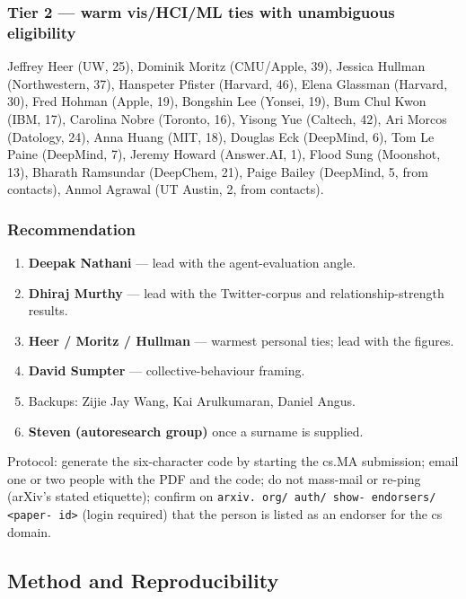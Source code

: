 \documentclass[twocolumn,10pt,letterpaper]{article}
\begin{document}
\subsubsection{Tier 2 — warm vis/HCI/ML ties with unambiguous eligibility}

Jeffrey Heer (UW, 25), Dominik Moritz (CMU/Apple, 39), Jessica Hullman (Northwestern, 37), Hanspeter Pfister (Harvard, 46), Elena Glassman (Harvard, 30), Fred Hohman (Apple, 19), Bongshin Lee (Yonsei, 19), Bum Chul Kwon (IBM, 17), Carolina Nobre (Toronto, 16), Yisong Yue (Caltech, 42), Ari Morcos (Datology, 24), Anna Huang (MIT, 18), Douglas Eck (DeepMind, 6), Tom Le Paine (DeepMind, 7), Jeremy Howard (Answer.AI, 1), Flood Sung (Moonshot, 13), Bharath Ramsundar (DeepChem, 21), Paige Bailey (DeepMind, 5, from contacts), Anmol Agrawal (UT Austin, 2, from contacts).


\subsubsection{Recommendation}

\begin{enumerate}
\setlength{\itemsep}{0pt}
\setlength{\parskip}{0pt}
  \item \textbf{Deepak Nathani} — lead with the agent-evaluation angle.
  \item \textbf{Dhiraj Murthy} — lead with the Twitter-corpus and relationship-strength results.
  \item \textbf{Heer / Moritz / Hullman} — warmest personal ties; lead with the figures.
  \item \textbf{David Sumpter} — collective-behaviour framing.
  \item Backups: Zijie Jay Wang, Kai Arulkumaran, Daniel Angus.
  \item \textbf{Steven (autoresearch group)} once a surname is supplied.
\end{enumerate}

Protocol: generate the six-character code by starting the cs.MA submission; email one or two people with the PDF and the code; do not mass-mail or re-ping (arXiv's stated etiquette); confirm on \texttt{arxiv. org/ auth/ show- endorsers/ <paper- id>} (login required) that the person is listed as an endorser for the cs domain.


\subsection{Method and Reproducibility}
\end{document}
